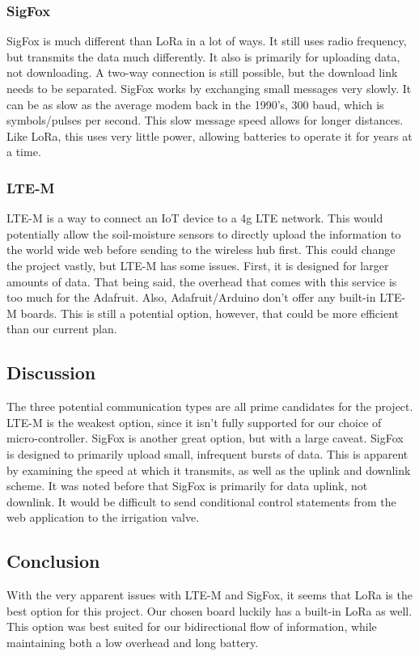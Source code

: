 \documentclass[onecolumn, draftclsnofoot,10pt, compsoc]{IEEEtran}
\begin{document}
    \subsubsection{SigFox}
    SigFox is much different than LoRa in a lot of ways.
    It still uses radio frequency, but transmits the data much differently. It also is primarily for uploading data, not downloading.
    A two-way connection is still possible, but the download link needs to be separated. SigFox works by exchanging small messages very slowly. 
    It can be as slow as the average modem back in the 1990's, 300 baud, which is symbols/pulses per second.
    This slow message speed allows for longer distances. Like LoRa, this uses very little power, allowing batteries to operate it for years at a time.
    
    \subsubsection{LTE-M}
    LTE-M is a way to connect an IoT device to a 4g LTE network. 
    This would potentially allow the soil-moisture sensors to directly upload the information to the world wide web before sending to the wireless hub first.
    This could change the project vastly, but LTE-M has some issues.
    First, it is designed for larger amounts of data. 
    That being said, the overhead that comes with this service is too much for the Adafruit.
    Also, Adafruit/Arduino don't offer any built-in LTE-M boards.
    This is still a potential option, however, that could be more efficient than our current plan.
    \subsection{Discussion}
    The three potential communication types are all prime candidates for the project.
    LTE-M is the weakest option, since it isn't fully supported for our choice of micro-controller. 
    SigFox is another great option, but with a large caveat. SigFox is designed to primarily upload small, infrequent bursts of data.
    This is apparent by examining the speed at which it transmits, as well as the uplink and downlink scheme.
    It was noted before that SigFox is primarily for data uplink, not downlink.
    It would be difficult to send conditional control statements from the web application to the irrigation valve. 
    
    \subsection{Conclusion}
    With the very apparent issues with LTE-M and SigFox, it seems that LoRa is the best option for this project. Our chosen board luckily has a built-in LoRa as well.
    This option was best suited for our bidirectional flow of information, while maintaining both a low overhead and long battery. 
    
\end{document}

